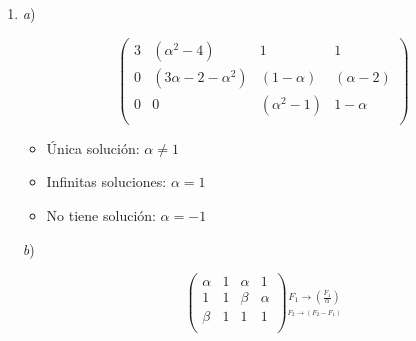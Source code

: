 \documentclass[11pt,a4paper]{article}
\begin{document}
\begin{enumerate}
\begin{center}
    $a_{ji} = b_{ij} - a_{ij} + b_{ij}$, $a_{ji} = 2b_{ij} - a_{ij}$, $\dfrac{a_{ji} + a_{ij}}{2} = b_{ij}$
    
    $a_{ij} = \dfrac{a_{ji} + a_{ij}}{2} + c_{ij}$
    
    $a_{ij} - \dfrac{a_{ji} + a_{ij}}{2} = c_{ij} \rightarrow c_{ji} = \dfrac{a_{ij} - a_{ji}}{2} $
    
    $b_{ij} = b_{ji}$
    
    $b_{ji} = \dfrac{a_{ji} + a_{ij}}{2}$
    
    $c_{ji} = -c_{ij}$
    
    $\dfrac{a_{ij} - a_{ji}}{2} = -c_{ij}$
    
    $\dfrac{-a_{ij} - a_{ji}}{2} = c_{ij}$
    
\end{center}

\item

\textit{a}) 

$$
\left(\begin{array}{ccc|c}  
 3 & (\alpha^2-4) & 1 & 1 \\  
 0 & (3\alpha -2 -\alpha^2) & (1-\alpha) & (\alpha-2)  \\ 
 0 & 0 & (\alpha^2-1) & 1-\alpha  \\ 
\end{array}\right)
$$

\begin{itemize}
\item Única solución: $\alpha \neq 1$ 
\end{itemize}

\begin{itemize}
\item Infinitas soluciones: $\alpha = 1$
\end{itemize}

\begin{itemize}
\item No tiene solución: $\alpha = -1$ 
\end{itemize}

\textit{b}) 

$$
\left(\begin{array}{ccc|c}  
 \alpha & 1 & \alpha & 1 \\  
 1 & 1 & \beta & \alpha  \\ 
 \beta & 1 & 1 & 1   \\ 
\end{array}\right) \underset{\overset{F_2\rightarrow (F_2-F_1)}{}}{\overset{F_1\rightarrow (\frac{F_1}{\alpha})}{}}
$$


\end{enumerate}
\end{document}
